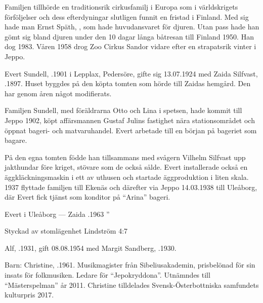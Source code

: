 Familjen tillhörde en traditionsrik cirkusfamilj i Europa som i världskrigets förföljelser och dess efterdyningar slutligen funnit en fristad i Finland. Med sig hade man Ernst Späth, , som hade huvudansvaret för djuren. Utan pass hade han gömt sig bland djuren under den 10 dagar långa båtresan till Finland 1950. Han dog 1983. Våren 1958 drog Zoo Cirkus Sandor vidare efter en strapatsrik vinter i Jeppo.


Evert Sundell, .1901 i Lepplax, Pedersöre, gifte sig 13.07.1924 med Zaida Silfvast, .1897. Huset byggdes på den köpta tomten som hörde till Zaidas hemgård. Den har genom åren något modifierats.

Familjen Sundell, med föräldrarna Otto och Lina i spetsen, hade kommit till Jeppo 1902, köpt affärsmannen Gustaf Julins fastighet nära stationsområdet och öppnat bageri- och matvaruhandel. Evert arbetade till en början på bageriet som bagare.

På den egna tomten födde han tillsammans med svågern Vilhelm Silfvast upp jakthundar före kriget, stövare som de också sålde. Evert installerade också en äggkläckningsmaskin i ett av uthusen och startade äggproduktion i liten skala. 1937 flyttade familjen till Ekenäs och därefter via Jeppo 14.03.1938 till Uleåborg, där Evert fick tjänst som konditor på ``Arina'' bageri.
\begin{jhchildren}
  \item {}
  \item {}
  \item {}
\end{jhchildren}
Evert  i Uleåborg  ---  Zaida .1963         ”



Styckad av stomlägenhet Lindström 4:7


Alf, .1931, gift 08.08.1954 med Margit Sandberg, .1930.

Barn: Christine, .1961. Musikmagister från Sibeliusakademin, prisbelönad för sin insats för folkmusiken. Ledare för ``Jepokryddona''. Utnämndes till ``Mästerspelman'' år 2011. Christine tilldelades Svensk-Österbottniska samfundets kulturpris 2017.

